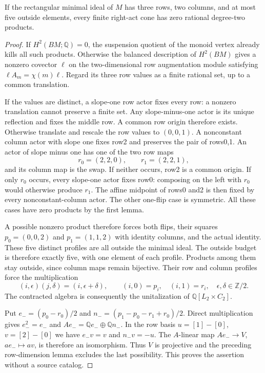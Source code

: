 \begin{proposition}
\label{CP2:A-three-row-five-outside-acts}
If the rectangular minimal ideal of $M$ has three rows,
two columns, and at most five outside elements, every
finite right-act cone has zero rational degree-two products.
\end{proposition}
\begin{proof}
If $H^2(BM;\mathbb Q)=0$, the suspension quotient of
the monoid vertex already kills all such products.
Otherwise the balanced description of $H^2(BM)$ gives
a nonzero covector $\ell$ on the two-dimensional row
augmentation module satisfying
$\ell A_m=\chi(m)\ell$. Regard its three row values
as a finite rational set, up to a common translation.

If the values are distinct, a slope-one row actor fixes
every row: a nonzero translation cannot preserve a
finite set. Any slope-minus-one actor is its unique
reflection and fixes the middle row. A common row
origin therefore exists. Otherwise translate and rescale
the row values to $(0,0,1)$. A nonconstant column actor
with slope one fixes row2 and preserves the pair of rows0,1.
An actor of slope minus one has one of the two row maps
\[
 r_0=(2,2,0),\qquad r_1=(2,2,1),
\]
and its column map is the swap. If neither occurs, row2
is a common origin. If only $r_0$ occurs, every slope-one
actor fixes row0: composing on the left with $r_0$
would otherwise produce $r_1$. The affine midpoint of
rows0 and2 is then fixed by every nonconstant-column
actor. The other one-flip case is symmetric.
All these cases have zero products by the first lemma.

A possible nonzero product therefore forces both flips,
their squares
$p_0=(0,0,2)$ and $p_1=(1,1,2)$ with identity columns,
and the actual identity. These five distinct profiles
are all outside the minimal ideal. The outside budget
is therefore exactly five, with one element of each
profile. Products among them stay outside, since column
maps remain bijective. Their row and column profiles
force the multiplication
\[
 (i,\epsilon)(j,\delta)=(i,\epsilon+\delta),
 \qquad (i,0)=p_i,\quad(i,1)=r_i,
 \quad\epsilon,\delta\in\mathbb Z/2.
\]
The contracted algebra is consequently the unitalization
of $\mathbb Q[L_2\times C_2]$.

Put $e_-=(p_0-r_0)/2$ and
$n_-=(p_1-p_0-r_1+r_0)/2$. Direct multiplication gives
$e_-^2=e_-$ and $Ae_-=\mathbb Qe_-\oplus\mathbb Qn_-$.
In the row basis $u=[1]-[0]$, $v=[2]-[0]$ we have
$e_-v=v$ and $n_-v=-u$. The $A$-linear map
$Ae_-\to V$, $ae_-\mapsto av$, is therefore an
isomorphism. Thus $V$ is projective and the preceding
row-dimension lemma excludes the last possibility.
This proves the assertion without a source catalog.
\end{proof}

